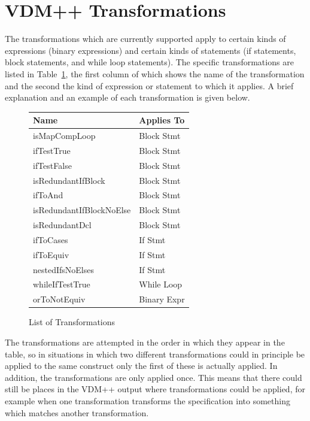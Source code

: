 \documentclass[\pformat,12pt]{article}
\begin{document}
\newpage
\section{VDM++ Transformations}
\label{xforms}

The transformations which are currently supported apply to certain
kinds of expressions (binary expressions) and certain kinds of
statements (if statements, block statements, and while loop
statements). The specific transformations are listed in
Table~\ref{fig:xfs}, the first column of which shows the 
name of the transformation and the second the kind of expression or
statement to which it applies. A brief explanation and an example of
each transformation is given below.

\begin{figure}[htbp]
  \begin{center}
\begin{tabular}{|l|l|}
\hline 
Name & Applies To\\ \hline \hline
isMapCompLoop & Block Stmt  \\ \hline
ifTestTrue & Block Stmt  \\ \hline
ifTestFalse & Block Stmt  \\ \hline
isRedundantIfBlock & Block Stmt \\ \hline
ifToAnd & Block Stmt  \\ \hline
isRedundantIfBlockNoElse & Block Stmt \\ \hline
isRedundantDcl & Block Stmt \\ \hline
ifToCases & If Stmt \\ \hline
ifToEquiv & If Stmt \\ \hline
nestedIfsNoElses & If Stmt  \\ \hline
whileIfTestTrue &  While Loop \\ \hline
orToNotEquiv & Binary Expr \\ \hline
\end{tabular}    
    \caption{List of Transformations}
    \label{fig:xfs}
  \end{center}
\end{figure}

The transformations are attempted in the order in which they appear in
the table, so in situations in which two different transformations
could in principle be applied to the same construct only the first of
these is actually applied. In addition, the transformations are only
applied once. This means that there could still be places in the VDM++
output where transformations could be applied, for example when one
transformation transforms the specification into something which
matches another transformation. 
\end{document}

